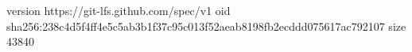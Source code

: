 version https://git-lfs.github.com/spec/v1
oid sha256:238c4d5f4ff4e5c5ab3b1f37c95c013f52aeab8198fb2ecddd075617ac792107
size 43840
